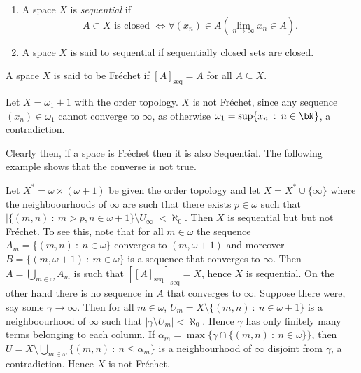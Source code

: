 \documentclass{article}
\newcommand{\seqcl}[1]{{[#1]_{\text{seq}}}}
\begin{document}
\begin{defn}
    \leavevmode
    \begin{enumerate}
        \item\cite{EK89} A space \(X\) is \textit{sequential} if 
        \[
        \displaystyle A \subset X \text{ is closed } \iff \forall (x_n) \in A\left(\lim_{n\to \infty} x_n \in A\right).
        \] 
        \item A space \(X\) is said to sequential if sequentially closed sets are closed.
    \end{enumerate}
    
\end{defn}
\begin{defn}
    A space \(X\) is said to be Fréchet if \(\seqcl{A} = \overline{A}\) for all \(A \subseteq X\).
\end{defn}
\begin{exam}
    Let \(X = \omega_1 + 1\) with the order topology. \(X\) is not Fréchet, since any sequence \((x_n) \in \omega_1\) cannot converge to \(\infty\), as otherwise \(\omega_1 = \sup\{x_n \: : \: n \in \bN\}\), a contradiction.
\end{exam}
Clearly then, if a space is Fréchet then it is also Sequential. The following example shows that the converse is not true. 
\begin{exam}
    Let \(X^{\ast} = \omega \times (\omega + 1)\) be given the order topology and let \(X =  X^{\ast} \cup \{\infty\}\) where the neighboourhoods  of \(\infty\) are such that there exists \(p \in \omega\) such that \(|\{(m, n) \: : \: m > p, n \in \omega + 1\} \setminus U_{\infty}| < \aleph_0\). Then \(X\) is sequential but but not Fréchet. To see this, note that for all \(m \in \omega\) the sequence \(A_m = \{(m, n) \: : \: n \in \omega\}\) converges to \((m, \omega + 1)\) and moreover \(B = \{(m, \omega + 1) \: : \: m \in \omega\}\) is a sequence that converges to \(\infty\). Then \(A = \bigcup_{m \in \omega} A_m\) is such that \(\seqcl{\seqcl{A}} = X\), hence \(X\) is sequential. On the other hand there is no sequence in \(A\) that converges to \(\infty\). Suppose there were, say some \(\gamma \to \infty\). Then for all \(m \in \omega\), \(U_m = X \setminus \{(m, n)\: : \: n \in \omega + 1\}\) is a neighboourhood of \(\infty\) such that \(|\gamma \setminus U_m| < \aleph_0\). Hence \(\gamma\) has only finitely many terms belonging to each column. If \(\alpha_m = \max\{\gamma \cap \{(m, n) \: : \: n \in \omega\}\}\), then \(U = X \setminus \bigcup_{m \in \omega} \{(m ,n )\: : \:  n \leq \alpha_m\}\) is a neighbourhood of \(\infty\) disjoint from \(\gamma\), a contradiction. Hence \(X\) is not Fréchet. 
\end{exam} 
\end{document}
